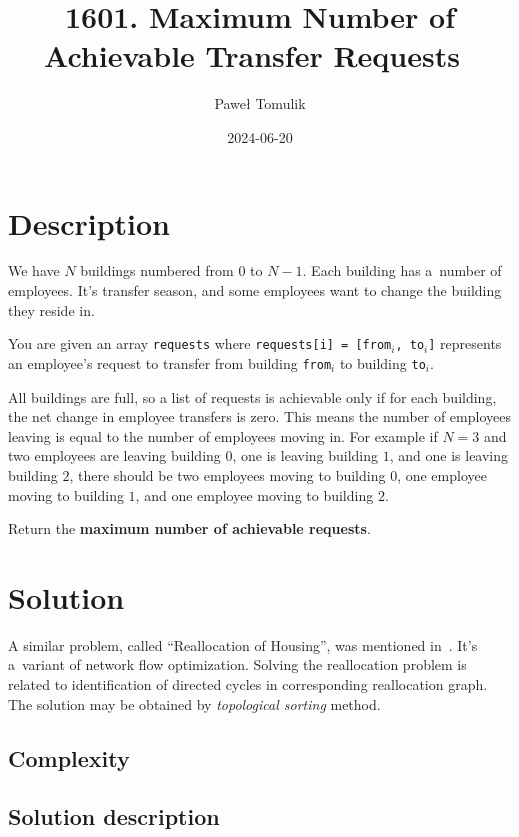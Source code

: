 \documentclass[paper=a4,parskip=half,DIV=12]{leetcode}
\begin{document}
\title{1601. Maximum Number of Achievable Transfer Requests~\cite{leetcode:1601}}
\subtitle{}
\author{Paweł Tomulik}
\date{2024-06-20}
\maketitle

\section{Description}
\label{sec:description}

We have $N$ buildings numbered from $0$ to $N - 1$. Each building has a~number
of employees. It's transfer season, and some employees want to change the
building they reside in.

You are given an array \texttt{requests} where \texttt{requests[i] = [from$_i$,
to$_i$]} represents an employee's request to transfer from building
\texttt{from$_i$} to building \texttt{to$_i$}.

All buildings are full, so a list of requests is achievable only if for each
building, the net change in employee transfers is zero. This means the number
of employees leaving is equal to the number of employees moving in. For example
if $N = 3$ and two employees are leaving building $0$, one is leaving building
$1$, and one is leaving building $2$, there should be two employees moving to
building $0$, one employee moving to building $1$, and one employee moving to
building $2$.

Return the \textbf{maximum number of achievable requests}.

\section{Solution}
\label{sec:solution}

A similar problem, called ``Reallocation of Housing'', was mentioned
in~\cite{ahuja1993network}. It's a~variant of network flow optimization.
Solving the reallocation problem is related to identification of directed
cycles in corresponding reallocation graph. The solution may be obtained by
{\em topological sorting} method.

\subsection{Complexity}
\label{sec:complexity}

\subsection{Solution description}
\label{sec:solution-description}
\end{document}
